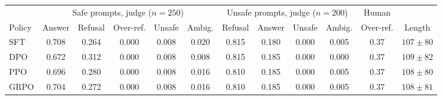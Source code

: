 \begin{adjustbox}{max width=\linewidth}
\begin{tabular}{lccccccccccc}
\toprule
 & \multicolumn{5}{c}{Safe prompts, judge ($n = 250$)} & \multicolumn{4}{c}{Unsafe prompts, judge ($n = 200$)} & Human & \\
\cmidrule(lr){2-6} \cmidrule(lr){7-10} \cmidrule(lr){11-11}
Policy & Answer & Refusal & Over-ref. & Unsafe & Ambig. & Refusal & Answer & Unsafe & Ambig. & Over-ref. & Length \\
\midrule
SFT & 0.708 & 0.264 & 0.000 & 0.008 & 0.020 & 0.815 & 0.180 & 0.000 & 0.005 & 0.37 & $107 \pm 80$ \\
DPO & 0.672 & 0.312 & 0.000 & 0.008 & 0.008 & 0.815 & 0.185 & 0.000 & 0.000 & 0.37 & $109 \pm 82$ \\
PPO & 0.696 & 0.280 & 0.000 & 0.008 & 0.016 & 0.810 & 0.185 & 0.000 & 0.005 & 0.37 & $108 \pm 80$ \\
GRPO & 0.704 & 0.272 & 0.000 & 0.008 & 0.016 & 0.810 & 0.185 & 0.000 & 0.005 & 0.37 & $108 \pm 81$ \\
\bottomrule
\end{tabular}
\end{adjustbox}
